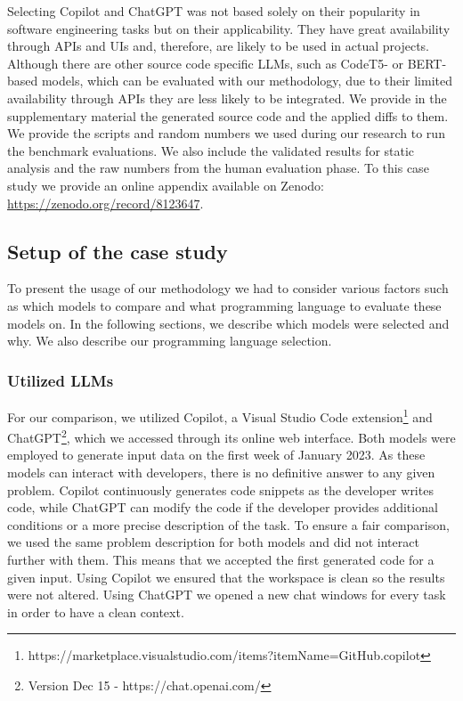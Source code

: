 Selecting Copilot and ChatGPT was not based solely on their popularity in software engineering tasks but on their applicability.
They have great availability through APIs and UIs and, therefore, are likely to be used in actual projects.
Although there are other source code specific LLMs, such as CodeT5- or BERT-based models, which can be evaluated with our methodology, due to their limited availability through APIs they are less likely to be integrated.
We provide in the supplementary material the generated source code and the applied diffs to them.
We provide the scripts and random numbers we used during our research to run the benchmark evaluations.
We also include the validated results for static analysis and the raw numbers from the human evaluation phase.
To this case study we provide an online appendix available on Zenodo: \href{https://zenodo.org/record/8123647}{https://zenodo.org/record/8123647}.


\subsection{Setup of the case study}

To present the usage of our methodology we had to consider various factors such as which models to compare and what programming language to evaluate these models on.
In the following sections, we describe which models were selected and why.
We also describe our programming language selection.

\subsubsection{Utilized LLMs}

For our comparison, we utilized Copilot, a Visual Studio Code extension\footnote{https://marketplace.visualstudio.com/items?itemName=GitHub.copilot} and ChatGPT\footnote{Version Dec 15 - https://chat.openai.com/}, which we accessed through its online web interface.
Both models were employed to generate input data on the first week of January 2023.
As these models can interact with developers, there is no definitive answer to any given problem.
Copilot continuously generates code snippets as the developer writes code, while ChatGPT can modify the code if the developer provides additional conditions or a more precise description of the task.
To ensure a fair comparison, we used the same problem description for both models and did not interact further with them.
This means that we accepted the first generated code for a given input.
Using Copilot we ensured that the workspace is clean so the results were not altered.
Using ChatGPT we opened a new chat windows for every task in order to have a clean context.

